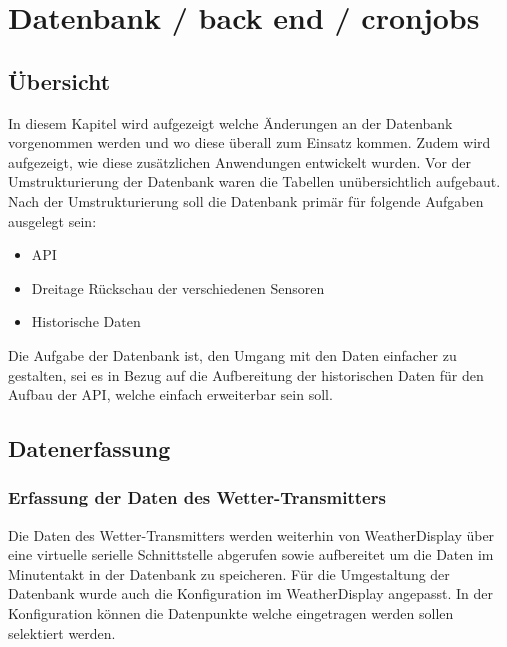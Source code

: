 \section{Datenbank / back end / cronjobs}

\subsection{Übersicht}

In diesem Kapitel wird aufgezeigt welche Änderungen an der Datenbank vorgenommen werden und wo diese überall zum Einsatz kommen. Zudem wird aufgezeigt, wie diese zusätzlichen Anwendungen entwickelt wurden. Vor der Umstrukturierung der Datenbank waren die Tabellen unübersichtlich aufgebaut. Nach der Umstrukturierung soll die Datenbank primär für folgende Aufgaben ausgelegt sein:\\
\begin{itemize}
\item API
\item Dreitage Rückschau der verschiedenen Sensoren
\item Historische Daten
\end{itemize}

Die Aufgabe der Datenbank ist, den Umgang mit den Daten einfacher zu gestalten, sei es in Bezug auf die Aufbereitung der historischen Daten für den Aufbau der API, welche einfach erweiterbar sein soll.



\subsection{Datenerfassung}
\subsubsection{Erfassung der Daten des Wetter-Transmitters}
Die Daten des Wetter-Transmitters werden weiterhin von WeatherDisplay über eine virtuelle serielle Schnittstelle abgerufen sowie aufbereitet um die Daten im Minutentakt in der Datenbank zu speicheren. Für die Umgestaltung der Datenbank wurde auch die Konfiguration im WeatherDisplay angepasst.  In der Konfiguration können die Datenpunkte welche eingetragen werden sollen selektiert werden.  
\newline
{}\newline

